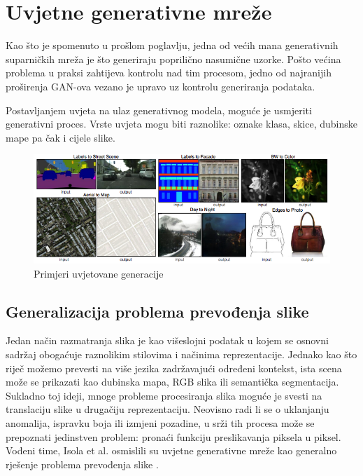 \documentclass[lmodern, utf8, seminar]{fer}
\begin{document}


\chapter{Uvjetne generativne mreže}
Kao što je spomenuto u prošlom poglavlju, jedna od većih mana generativnih suparničkih mreža je što generiraju poprilično nasumične uzorke. Pošto većina problema u praksi zahtijeva kontrolu nad tim procesom, jedno od najranijih proširenja GAN-ova vezano je upravo uz kontrolu generiranja podataka. 

Postavljanjem uvjeta na ulaz generativnog modela, moguće je usmjeriti generativni proces. Vrste uvjeta mogu biti raznolike: oznake klasa, skice, dubinske mape pa čak i cijele slike.

\begin{figure}[H]
    \centering
    \includegraphics[width=1\textwidth]{isola2017-conditioned-generation}
    \caption{Primjeri uvjetovane generacije}
    \label{fig:isola2017-conditioned-generation}
\end{figure}

\newpage
\section{Generalizacija problema prevođenja slike}
Jedan način razmatranja slika je kao višeslojni podatak u kojem se osnovni sadržaj obogaćuje raznolikim stilovima i načinima reprezentacije. 
Jednako kao što riječ možemo prevesti na više jezika zadržavajući određeni kontekst, ista scena može se prikazati kao dubinska mapa, RGB slika ili semantička segmentacija. Sukladno toj ideji, mnoge probleme procesiranja slika moguće je svesti na translaciju slike u drugačiju reprezentaciju. Neovisno radi li se o uklanjanju anomalija, ispravku boja ili izmjeni pozadine, u srži tih procesa može se prepoznati jedinstven problem: pronaći funkciju preslikavanja piksela u piksel. Vođeni time, Isola et al. osmislili su uvjetne generativne mreže kao generalno rješenje problema prevođenja slike \cite{isola2017image}.
\newline
\end{document}
